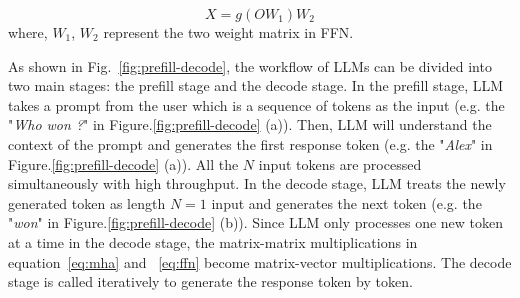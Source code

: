 \begin{equation}
    X = g(O W_1)W_2
\label{eq:ffn}
\end{equation}
where, $W_{1}$, $W_{2}$ represent the two weight matrix in FFN.

As shown in Fig.~\ref{fig:prefill-decode}, the workflow of LLMs can be divided into two main stages: the prefill stage and the decode stage.
In the prefill stage, LLM takes a prompt from the user which is a sequence of tokens as the input (e.g. the "\textit{Who won ?}" in Figure.\ref{fig:prefill-decode} (a)).
Then, LLM will understand the context of the prompt and generates the first response token (e.g. the "\textit{Alex}" in Figure.\ref{fig:prefill-decode} (a)).
All the $N$ input tokens are processed simultaneously with high throughput.
In the decode stage, LLM treats the newly generated token as length $N=1$ input and generates the next token (e.g. the "\textit{won}" in Figure.\ref{fig:prefill-decode} (b)). Since LLM only processes one new token at a time in the decode stage, the matrix-matrix multiplications in equation~\ref{eq:mha} and ~\ref{eq:ffn} become matrix-vector multiplications.
The decode stage is called iteratively to generate the response token by token.

